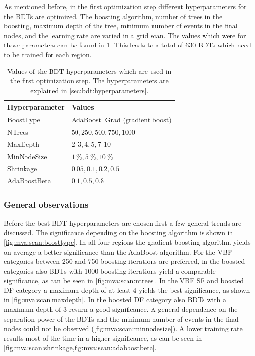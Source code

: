As mentioned before, in the first optimization step different hyperparameters for the BDTs
are optimized.
The boosting algorithm, number of trees in the boosting, maximum depth of the tree, minimum number of events in the final nodes,
and the learning rate are varied in a grid scan.
The values which were for those parameters can be found in \cref{tab:mva:hpyerparameterscan}.
This leads to a total of 630 BDTs which need to be trained for each region.

\begin{table}[htpb]
    \centering
    \caption{Values of the BDT hyperparameters which are used in the first optimization step.
    The hyperparameters are explained in \cref{sec:bdt:hyperparameters}.}\label{tab:mva:hpyerparameterscan}
    \begin{tabular}{ll}
        \toprule
        Hyperparameter   & Values \\ \midrule
        BoostType   & AdaBoost, Grad (gradient boost) \\
        NTrees      & $50, 250, 500, 750, 1000$ \\
        MaxDepth    & $2, 3, 4, 5, 7, 10$ \\
        MinNodeSize & $\SI{1}{\percent}, \SI{5}{\percent}, \SI{10}{\percent}$ \\
        Shrinkage   & $0.05, 0.1, 0.2, 0.5$ \\
        AdaBoostBeta& $0.1, 0.5, 0.8$ \\
        \bottomrule
    \end{tabular}
\end{table}

\subsubsection{General observations}

Before the best BDT hyperparameters are chosen first a few general trends are discussed.
The significance depending on the boosting algorithm is shown in \cref{fig:mva:scan:boosttype}.
In all four regions the gradient-boosting algorithm yields on average a better significance than the AdaBoost algorithm.
For the VBF categories between 250 and 750 boosting iterations are preferred, in the boosted categories also BDTs with
1000 boosting iterations yield a comparable significance, as can be seen in \cref{fig:mva:scan:ntrees}.
In the VBF SF and boosted DF category a maximum depth of at least 4 yields the best significance, as shown
in \cref{fig:mva:scan:maxdepth}.
In the boosted DF category also BDTs with a maximum depth of 3 return a good significance.
A general dependence on the separation power of the BDTs and the minimum number of events in the final
nodes could not be observed (\cref{fig:mva:scan:minnodesize}).
A lower training rate results most of the time in a higher significance, as can be seen in \cref{fig:mva:scan:shrinkage,fig:mva:scan:adaboostbeta}.

